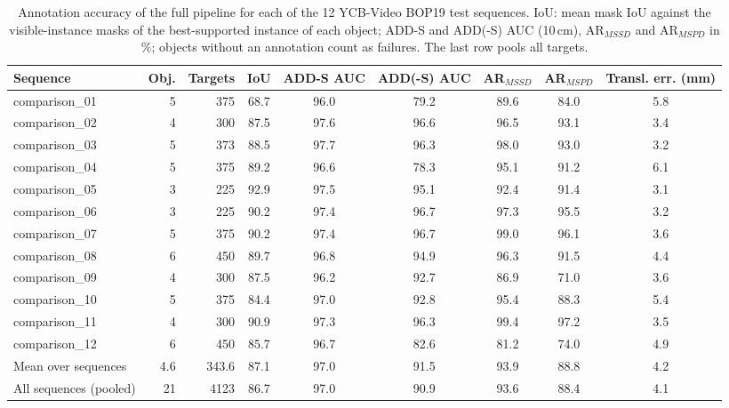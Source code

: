 \begin{table}[t]
\centering
\small
\caption{Annotation accuracy of the full pipeline for each of the 12 YCB-Video BOP19 test sequences. IoU: mean mask IoU against the visible-instance masks of the best-supported instance of each object; ADD-S and ADD(-S) AUC (10\,cm), AR$_{MSSD}$ and AR$_{MSPD}$ in \%; objects without an annotation count as failures. The last row pools all targets.}
\label{tab:annotation_accuracy_sequences}
\begin{tabular}{lrrcccccc}
\hline
Sequence & Obj. & Targets & IoU & ADD-S AUC & ADD(-S) AUC & AR$_{MSSD}$ & AR$_{MSPD}$ & Transl. err. (mm) \\
\hline
comparison\_01 & 5 & 375 & 68.7 & 96.0 & 79.2 & 89.6 & 84.0 & 5.8 \\
comparison\_02 & 4 & 300 & 87.5 & 97.6 & 96.6 & 96.5 & 93.1 & 3.4 \\
comparison\_03 & 5 & 373 & 88.5 & 97.7 & 96.3 & 98.0 & 93.0 & 3.2 \\
comparison\_04 & 5 & 375 & 89.2 & 96.6 & 78.3 & 95.1 & 91.2 & 6.1 \\
comparison\_05 & 3 & 225 & 92.9 & 97.5 & 95.1 & 92.4 & 91.4 & 3.1 \\
comparison\_06 & 3 & 225 & 90.2 & 97.4 & 96.7 & 97.3 & 95.5 & 3.2 \\
comparison\_07 & 5 & 375 & 90.2 & 97.4 & 96.7 & 99.0 & 96.1 & 3.6 \\
comparison\_08 & 6 & 450 & 89.7 & 96.8 & 94.9 & 96.3 & 91.5 & 4.4 \\
comparison\_09 & 4 & 300 & 87.5 & 96.2 & 92.7 & 86.9 & 71.0 & 3.6 \\
comparison\_10 & 5 & 375 & 84.4 & 97.0 & 92.8 & 95.4 & 88.3 & 5.4 \\
comparison\_11 & 4 & 300 & 90.9 & 97.3 & 96.3 & 99.4 & 97.2 & 3.5 \\
comparison\_12 & 6 & 450 & 85.7 & 96.7 & 82.6 & 81.2 & 74.0 & 4.9 \\
\hline
Mean over sequences & 4.6 & 343.6 & 87.1 & 97.0 & 91.5 & 93.9 & 88.8 & 4.2 \\
All sequences (pooled) & 21 & 4123 & 86.7 & 97.0 & 90.9 & 93.6 & 88.4 & 4.1 \\
\hline
\end{tabular}
\end{table}
